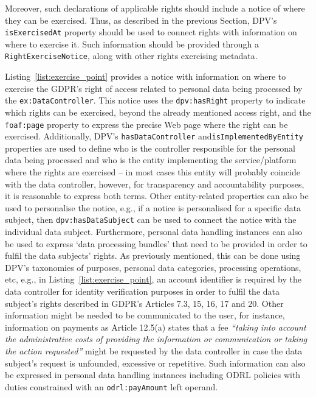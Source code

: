 Moreover, such declarations of applicable rights should include a notice of where they can be exercised.
Thus, as described in the previous Section, DPV’s \texttt{isExercisedAt} property should be used to connect rights with information on where to exercise it.
Such information should be provided through a \texttt{RightExerciseNotice}, along with other rights exercising metadata.

Listing~\ref{list:exercise_point} provides a notice with information on where to exercise the GDPR's right of access related to personal data being processed by the \texttt{ex:DataController}.
This notice uses the \texttt{dpv:hasRight} property to indicate which rights can be exercised, beyond the already mentioned access right, and the \texttt{foaf:page} property to express the precise Web page where the right can be exercised.
Additionally, DPV's \texttt{hasDataController} and\linebreak \texttt{isImplementedByEntity} properties are used to define who is the controller responsible for the personal data being processed and who is the entity implementing the service/platform where the rights are exercised -- in most cases this entity will probably coincide with the data controller, however, for transparency and accountability purposes, it is reasonable to express both terms.
Other entity-related properties can also be used to personalise the notice, e.g., if a notice is personalised for a specific data subject, then \texttt{dpv:hasDataSubject} can be used to connect the notice with the individual data subject. 
Furthermore, personal data handling instances can also be used to express `data processing bundles' that need to be provided in order to fulfil the data subjects' rights.
As previously mentioned, this can be done using DPV's taxonomies of purposes, personal data categories, processing operations, etc, e.g., in Listing~\ref{list:exercise_point}, an account identifier is required by the data controller for identity verification purposes in order to fulfil the data subject's rights described in GDPR's Articles 7.3, 15, 16, 17 and 20.
Other information might be needed to be communicated to the user, for instance, information on payments as Article 12.5(a) states that a fee \textit{``taking into account the administrative costs of providing the information or communication or taking the action requested''} might be requested by the data controller in case the data subject's request is unfounded, excessive or repetitive.
Such information can also be expressed in personal data handling instances including ODRL policies with duties constrained with an \texttt{odrl:payAmount} left operand.

